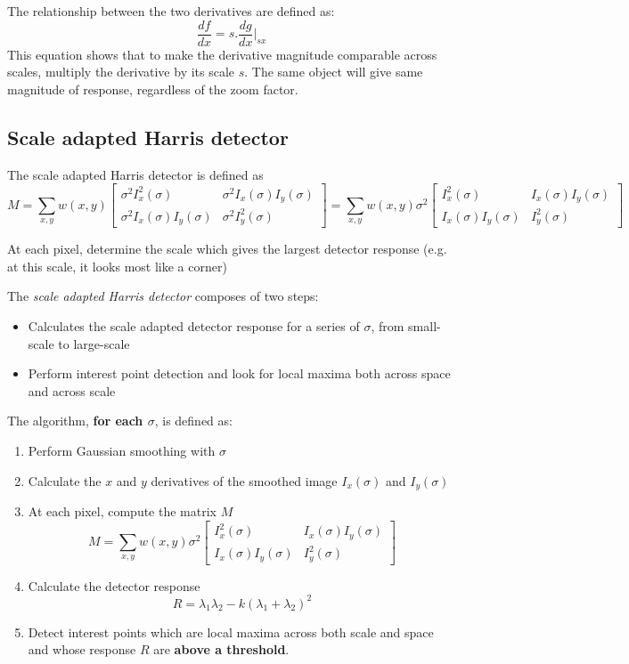 \documentclass{report}
\begin{document}
The relationship between the two derivatives are defined as:
$$
    \frac{df}{dx} = s . \frac{dg}{dx} |_{sx}
$$
This equation shows that to make the derivative magnitude comparable across
scales, multiply the derivative by its scale $s$. The same object will give same
magnitude of response, regardless of the zoom factor.

\subsection{Scale adapted Harris detector}

The scale adapted Harris detector is defined as 
$$
    M = \sum_{x,y} w(x,y) \begin{bmatrix}
        \sigma^2 I_x^2(\sigma) & \sigma^2 I_x(\sigma) I_y(\sigma) \\
        \sigma^2 I_x(\sigma)I_y(\sigma) & \sigma^2 I_y^2(\sigma)
    \end{bmatrix} = \sum_{x,y}w(x,y) \sigma^2 \begin{bmatrix}
        I_x^2(\sigma) & I_x(\sigma) I_y(\sigma) \\
        I_x(\sigma)I_y(\sigma) &  I_y^2(\sigma)
    \end{bmatrix}
$$

At each pixel, determine the scale which gives the largest detector response (e.g. at this scale, it looks most like a corner)

The \textit{scale adapted Harris detector} composes of two steps:
\begin{itemize}
    \item Calculates the scale adapted detector response for a series of
    $\sigma$, from small-scale to large-scale
    
    \item Perform interest point detection and look for local maxima both
    across space and across scale
\end{itemize}

The algorithm, \textbf{for each $\sigma$}, is defined as:
\begin{enumerate}
    \item Perform Gaussian smoothing with $\sigma$
    \item Calculate the $x$ and $y$ derivatives of the smoothed image
    $I_x(\sigma)$ and $I_y(\sigma)$
    \item At each pixel, compute the matrix $M$
    $$
        M = \sum_{x,y}w(x,y) \sigma^2 \begin{bmatrix}
            I_x^2(\sigma) & I_x(\sigma) I_y(\sigma) \\
            I_x(\sigma)I_y(\sigma) &  I_y^2(\sigma)
        \end{bmatrix}
    $$
    \item Calculate the detector response
    $$
        R = \lambda_1 \lambda_2 - k(\lambda_1 + \lambda_2)^2
    $$
    \item Detect interest points which are local maxima across both scale and space
    and whose response $R$ are \textbf{above a threshold}.
\end{enumerate}
\end{document}
